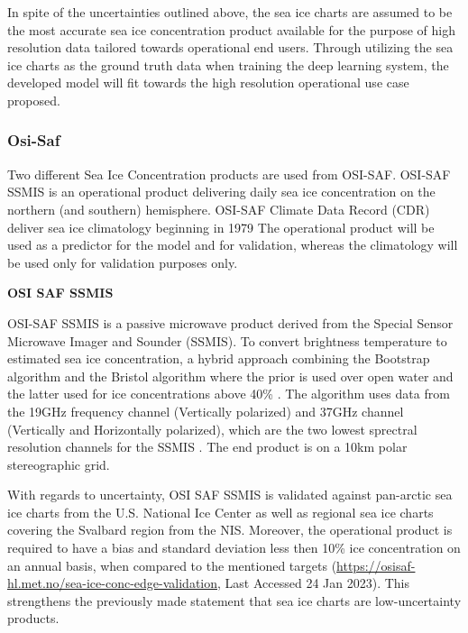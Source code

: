 \documentclass[../main/thesis.tex]{subfiles}
\begin{document}
In spite of the uncertainties outlined above, the sea ice charts are assumed to be the most accurate sea ice concentration product available for the purpose of high resolution data tailored towards operational end users. Through utilizing the sea ice charts as the ground truth data when training the deep learning system, the developed model will fit towards the high resolution operational use case proposed.

\subsubsection{Osi-Saf}
Two different Sea Ice Concentration products are used from OSI-SAF. OSI-SAF SSMIS is an operational product delivering daily sea ice concentration on the northern (and southern) hemisphere. OSI-SAF Climate Data Record (CDR) \citep{Soerensen2021} deliver sea ice climatology beginning in 1979 \citep{Lavergne2019} The operational product will be used as a predictor for the model and for validation, whereas the climatology will be used only for validation purposes only. 

\textbf{OSI SAF SSMIS}

OSI-SAF SSMIS is a passive microwave product derived from the Special Sensor Microwave Imager and Sounder (SSMIS). To convert brightness temperature to estimated sea ice concentration, a hybrid approach combining the Bootstrap algorithm \citep{Comiso1997} and the Bristol algorithm \citep{Smith1996} where the prior is used over open water and the latter used for ice concentrations above 40\% \citep{Tonboe2017}. The algorithm uses data from the 19GHz frequency channel (Vertically polarized) and 37GHz channel (Vertically and Horizontally polarized), which are the two lowest sprectral resolution channels for the SSMIS \cite{Tonboe2017}. The end product is on a 10km polar stereographic grid.

With regards to uncertainty, OSI SAF SSMIS is validated against pan-arctic sea ice charts from the U.S. National Ice Center as well as regional sea ice charts covering the Svalbard region from the NIS. Moreover, the operational product is required to have a bias and standard deviation less then 10\% ice concentration on an annual basis, when compared to the mentioned targets (\url{https://osisaf-hl.met.no/sea-ice-conc-edge-validation}, Last Accessed 24 Jan 2023). This strengthens the previously made statement that sea ice charts are low-uncertainty products.
\end{document}
